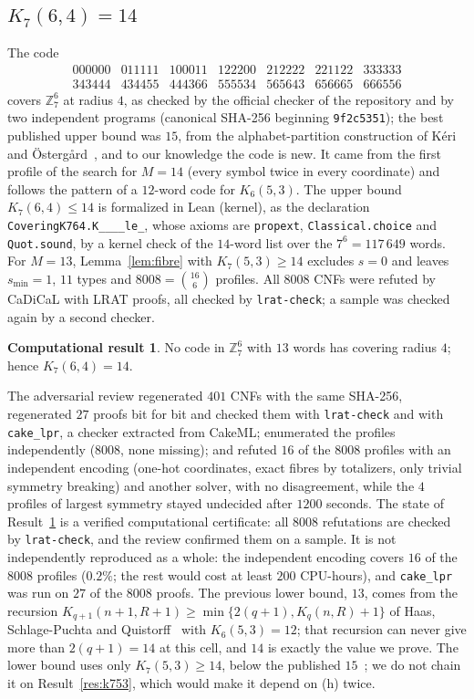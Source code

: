 \documentclass[11pt]{amsart}
\theoremstyle{definition}
\newtheorem{result}[theorem]{Computational result}
\theoremstyle{remark}
\begin{document}
\subsection*{$K_7(6,4)=14$}
The code
\[
\begin{array}{ccccccc}
000000 & 011111 & 100011 & 122200 & 212222 & 221122 & 333333\\
343444 & 434455 & 444366 & 555534 & 565643 & 656665 & 666556
\end{array}
\]
covers $\mathbb{Z}_7^6$ at radius $4$, as checked by the official checker of the repository and by two independent programs (canonical SHA-256 beginning \texttt{9f2c5351}); the best published upper bound was $15$, from the alphabet-partition construction of Kéri and Östergård~\cite{ko2005}, and to our knowledge the code is new.
It came from the first profile of the search for $M=14$ (every symbol twice in every coordinate) and follows the pattern of a $12$-word code for $K_6(5,3)$.
The upper bound $K_7(6,4)\le 14$ is formalized in Lean (kernel), as the declaration \texttt{CoveringK764.\allowbreak K\_\_\_\_\allowbreak le\_}, whose axioms are \texttt{propext}, \texttt{Classical.choice} and \texttt{Quot.sound}, by a kernel check of the $14$-word list over the $7^6=117\,649$ words.
For $M=13$, Lemma~\ref{lem:fibre} with $K_7(5,3)\ge 14$ excludes $s=0$ and leaves $s_{\min}=1$, $11$ types and $8008=\binom{16}{6}$ profiles.
All $8008$ CNFs were refuted by CaDiCaL with LRAT proofs, all checked by \texttt{lrat-check}; a sample was checked again by a second checker.

\begin{result}\label{res:k764}
No code in $\mathbb{Z}_7^6$ with $13$ words has covering radius $4$; hence $K_7(6,4)=14$.
\end{result}
The adversarial review regenerated $401$ CNFs with the same SHA-256, regenerated $27$ proofs bit for bit and checked them with \texttt{lrat-check} and with \texttt{cake\_lpr}, a checker extracted from CakeML; enumerated the profiles independently ($8008$, none missing); and refuted $16$ of the $8008$ profiles with an independent encoding (one-hot coordinates, exact fibres by totalizers, only trivial symmetry breaking) and another solver, with no disagreement, while the $4$ profiles of largest symmetry stayed undecided after $1200$ seconds.
The state of Result~\ref{res:k764} is a verified computational certificate: all $8008$ refutations are checked by \texttt{lrat-check}, and the review confirmed them on a sample. It is not independently reproduced as a whole: the independent encoding covers $16$ of the $8008$ profiles ($0.2\%$; the rest would cost at least $200$ CPU-hours), and \texttt{cake\_lpr} was run on $27$ of the $8008$ proofs.
The previous lower bound, $13$, comes from the recursion $K_{q+1}(n+1,R+1)\ge\min\{2(q+1),K_q(n,R)+1\}$ of Haas, Schlage-Puchta and Quistorff~\cite[Thm.~6]{hsq2009} with $K_6(5,3)=12$; that recursion can never give more than $2(q+1)=14$ at this cell, and $14$ is exactly the value we prove.
The lower bound uses only $K_7(5,3)\ge 14$, below the published $15$~\cite{keri}; we do not chain it on Result~\ref{res:k753}, which would make it depend on (h) twice.
\end{document}
